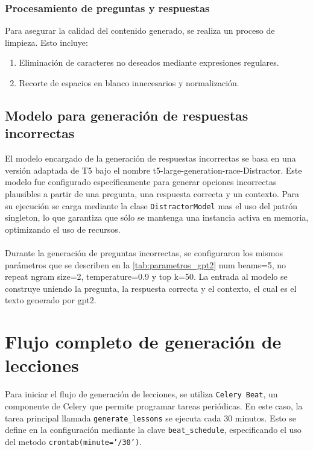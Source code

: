 \subsubsection{Procesamiento de preguntas y respuestas}

Para asegurar la calidad del contenido generado, se realiza un proceso de limpieza. Esto incluye:

\begin{enumerate}
    \item Eliminación de caracteres no deseados mediante expresiones regulares.
    \item Recorte de espacios en blanco innecesarios y normalización.
\end{enumerate}

\subsection{Modelo para generación de respuestas incorrectas}

El modelo encargado de la generación de respuestas incorrectas se basa en una versión adaptada de T5 bajo el nombre t5-large-generation-race-Distractor. Este modelo fue configurado específicamente para generar opciones incorrectas plausibles a partir de una pregunta, una respuesta correcta y un contexto. Para su ejecución se carga mediante la clase  \texttt{DistractorModel} mas el uso del patrón singleton, lo que garantiza que sólo se mantenga una instancia activa en memoria, optimizando el uso de recursos.
\\
\\
Durante la generación de preguntas incorrectas, se configuraron los mismos parámetros que se describen en la \autoref {tab:parametros_gpt2} num beams=5, no repeat ngram size=2, temperature=0.9 y top k=50. La entrada al modelo se construye uniendo la pregunta, la respuesta correcta y el contexto, el cual es el texto generado por gpt2.

\newpage
\section{Flujo completo de generación de lecciones}

Para iniciar el flujo de generación de lecciones, se utiliza \texttt{Celery Beat}, un componente de Celery que permite programar tareas periódicas. En este caso, la tarea principal llamada \texttt{generate\_lessons} se ejecuta cada 30 minutos. Esto se define en la configuración mediante la clave \texttt{beat\_schedule}, especificando el uso del metodo \texttt{crontab(minute='\*/30')}.

